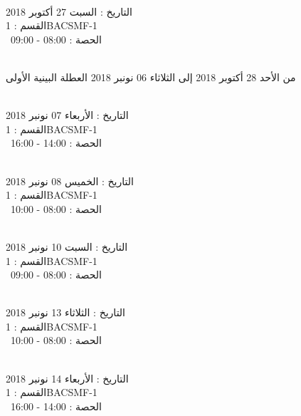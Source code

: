\documentclass[14pt a4paper twocolumn]{book}
\begin{document}
\par
\noindent\makebox[\linewidth]{\rule{\paperwidth}{0.4pt}}
 \\
التاريخ : السبت 27 أكتوبر 2018 \\
القسم : 1BACSMF-1 \\
 \  
الحصة : 08:00 - 09:00 \\
\par
\noindent\makebox[\linewidth]{\rule{\paperwidth}{0.4pt}}
 \\
من الأحد 28 أكتوبر 2018 إلى الثلاثاء 06 نونبر 2018
\newline
\indent
 العطلة البينية الأولى
\par
\noindent\makebox[\linewidth]{\rule{\paperwidth}{0.4pt}}
 \\
التاريخ : الأربعاء 07 نونبر 2018 \\
القسم : 1BACSMF-1 \\
 \  
الحصة : 14:00 - 16:00 \\
\par
\noindent\makebox[\linewidth]{\rule{\paperwidth}{0.4pt}}
 \\
التاريخ : الخميس 08 نونبر 2018 \\
القسم : 1BACSMF-1 \\
 \  
الحصة : 08:00 - 10:00 \\
\par
\noindent\makebox[\linewidth]{\rule{\paperwidth}{0.4pt}}
 \\
التاريخ : السبت 10 نونبر 2018 \\
القسم : 1BACSMF-1 \\
 \  
الحصة : 08:00 - 09:00 \\
\par
\noindent\makebox[\linewidth]{\rule{\paperwidth}{0.4pt}}
 \\
التاريخ : الثلاثاء 13 نونبر 2018 \\
القسم : 1BACSMF-1 \\
 \  
الحصة : 08:00 - 10:00 \\
\par
\noindent\makebox[\linewidth]{\rule{\paperwidth}{0.4pt}}
 \\
التاريخ : الأربعاء 14 نونبر 2018 \\
القسم : 1BACSMF-1 \\
 \  
الحصة : 14:00 - 16:00 \\
\end{document}
